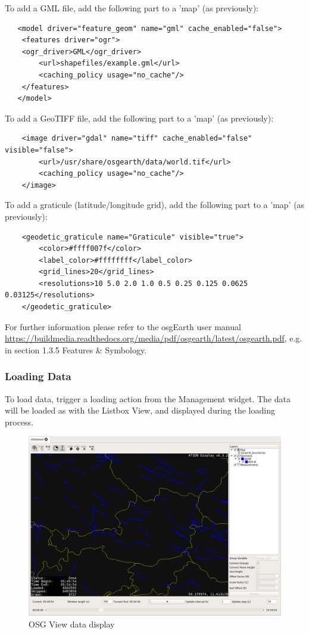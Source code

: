 {To add a GML file, add the following part to a 'map' (as previously):

\begin{verbatim}
   <model driver="feature_geom" name="gml" cache_enabled="false">
    <features driver="ogr">
	<ogr_driver>GML</ogr_driver>
        <url>shapefiles/example.gml</url>
        <caching_policy usage="no_cache"/>
    </features>
   </model>
\end{verbatim}

To add a GeoTIFF file, add the following part to a 'map' (as previously):

\begin{verbatim}
    <image driver="gdal" name="tiff" cache_enabled="false" visible="false">
        <url>/usr/share/osgearth/data/world.tif</url>
        <caching_policy usage="no_cache"/>
    </image>
\end{verbatim}

To add a graticule (latitude/longitude grid), add the following part to a 'map' (as previously):

\begin{verbatim}
    <geodetic_graticule name="Graticule" visible="true">
        <color>#ffff007f</color>
        <label_color>#ffffffff</label_color>
        <grid_lines>20</grid_lines>
        <resolutions>10 5.0 2.0 1.0 0.5 0.25 0.125 0.0625 0.03125</resolutions>
    </geodetic_graticule>
\end{verbatim}


For further information please refer to the osgEarth user manual \url{https://buildmedia.readthedocs.org/media/pdf/osgearth/latest/osgearth.pdf}, e.g. in section 1.3.5 Features \& Symbology.


\subsubsection{Loading Data}
To load data, trigger a loading action from the Management widget. The data will be loaded as with the Listbox View, and displayed during the loading process. 

\begin{figure}[H]
    \hspace*{-2cm}
    \includegraphics[width=18cm,frame]{../screenshots/osgview_data.png}
  \caption{OSG View data display}
  \label{fig:osgview_data}
\end{figure}

}
